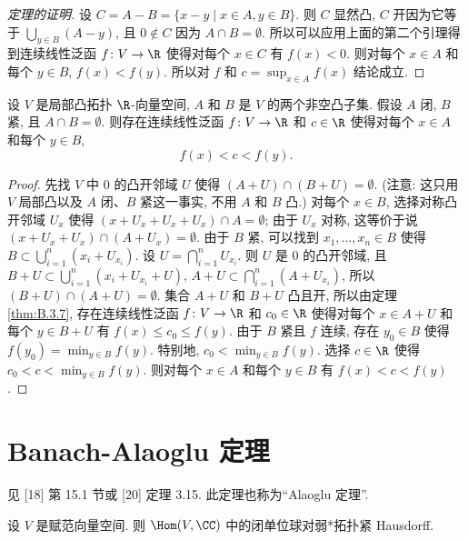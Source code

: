 \begin{proof}[定理的证明]
设 $C = A - B = \{x - y \mid x \in A, y \in B\}$. 则 $C$ 显然凸, $C$ 开因为它等于 $\bigcup_{y \in B}(A - y)$, 且 $0 \notin C$ 因为 $A \cap B = \emptyset$. 所以可以应用上面的第二个引理得到连续线性泛函 $f \colon V \to \R$ 使得对每个 $x \in C$ 有 $f(x) < 0$. 则对每个 $x \in A$ 和每个 $y \in B$, $f(x) < f(y)$. 所以对 $f$ 和 $c = \sup_{x \in A}f(x)$ 结论成立.
\end{proof}

\begin{theorem}
\label{thm:B.3.10}
设 $V$ 是局部凸拓扑 $\R$-向量空间, $A$ 和 $B$ 是 $V$ 的两个非空凸子集. 假设 $A$ 闭, $B$ 紧, 且 $A \cap B = \emptyset$.
则存在连续线性泛函 $f \colon V \to \R$ 和 $c \in \R$ 使得对每个 $x \in A$ 和每个 $y \in B$,
\[
f(x) < c < f(y).
\]
\end{theorem}

\begin{proof}
先找 $V$ 中 $0$ 的凸开邻域 $U$ 使得 $(A + U) \cap (B + U) = \emptyset$. (注意: 这只用 $V$ 局部凸以及 $A$ 闭、$B$ 紧这一事实, 不用 $A$ 和 $B$ 凸.)
对每个 $x \in B$, 选择对称凸开邻域 $U_x$ 使得 $(x + U_x + U_x + U_x) \cap A = \emptyset$; 由于 $U_x$ 对称, 这等价于说 $(x + U_x + U_x) \cap (A + U_x) = \emptyset$. 由于 $B$ 紧, 可以找到 $x_1, \ldots, x_n \in B$ 使得 $B \subset \bigcup_{i=1}^n(x_i + U_{x_i})$. 设 $U = \bigcap_{i=1}^n U_{x_i}$. 则 $U$ 是 $0$ 的凸开邻域, 且 $B + U \subset \bigcup_{i=1}^n(x_i + U_{x_i} + U)$, $A + U \subset \bigcap_{i=1}^n(A + U_{x_i})$, 所以 $(B + U) \cap (A + U) = \emptyset$.
集合 $A + U$ 和 $B + U$ 凸且开, 所以由定理 \ref{thm:B.3.7}, 存在连续线性泛函 $f \colon V \to \R$ 和 $c_0 \in \R$ 使得对每个 $x \in A + U$ 和每个 $y \in B + U$ 有 $f(x) \leq c_0 \leq f(y)$. 由于 $B$ 紧且 $f$ 连续, 存在 $y_0 \in B$ 使得 $f(y_0) = \min_{y \in B}f(y)$. 特别地, $c_0 < \min_{y \in B}f(y)$. 选择 $c \in \R$ 使得 $c_0 < c < \min_{y \in B}f(y)$. 则对每个 $x \in A$ 和每个 $y \in B$ 有 $f(x) < c < f(y)$.
\end{proof}

\section{Banach-Alaoglu 定理}
见 {[}18{]} 第 15.1 节或 {[}20{]} 定理 3.15. 此定理也称为``Alaoglu 定理''.

\begin{theorem}
\label{thm:B.4.1}
设 $V$ 是赋范向量空间. 则 $\Hom(V, \CC)$ 中的闭单位球对弱*拓扑紧 Hausdorff.
\end{theorem}

